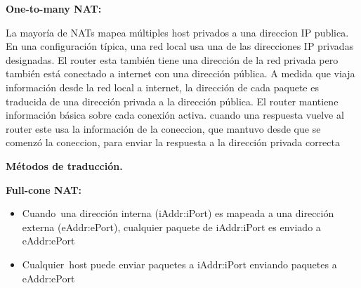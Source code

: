 \documentclass{article}
\begin{document}
\vspace{\baselineskip}

\vspace{\baselineskip}

\vspace{\baselineskip}
\textbf{One-to-many NAT:}\par

La mayoría de NATs mapea múltiples host privados a una direccion IP publica. En una configuración típica, una red local usa una de las direcciones IP privadas designadas. El router esta también tiene una dirección de la red privada pero también está conectado a internet con una dirección pública. A medida que viaja información desde la red local a internet, la dirección de cada paquete es traducida de una dirección privada a la dirección pública. El router mantiene información básica sobre cada conexión activa. cuando una respuesta vuelve al router este usa la información de la coneccion, que mantuvo desde que se comenzó la coneccion, para enviar la respuesta a la dirección privada correcta\par


\vspace{\baselineskip}

\vspace{\baselineskip}
\begin{center}
	{\fontsize{14pt}{16.8pt}\selectfont \textbf{Métodos de traducción.}\par}
\end{center}\par


\vspace{\baselineskip}

\vspace{\baselineskip}
\begin{flushleft}
	{\fontsize{14pt}{16.8pt}\selectfont \textbf{Full-cone NAT:}\par}
\end{flushleft}\par

\begin{itemize}
	\item Cuando\ una dirección interna (iAddr:iPort) es mapeada a una dirección externa (eAddr:ePort), cualquier paquete de iAddr:iPort es enviado a eAddr:ePort  \par
	
	
	\vspace{\baselineskip}
	\item Cualquier\ host puede enviar paquetes a iAddr:iPort enviando paquetes a  eAddr:ePort 
\end{itemize}\par
\end{document}
